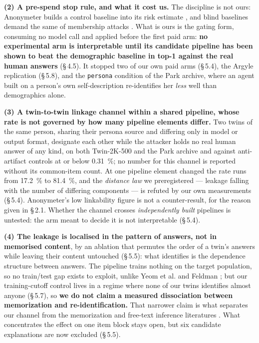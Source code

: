 \documentclass[sigconf,anonymous,review]{acmart}
\begin{document}
\textbf{(2) A pre-spend stop rule, and what it cost us.} The discipline is not ours: Anonymeter builds a control baseline into its risk estimate \cite{giomi2023unified}, and blind baselines demand the same of membership attacks \cite{das2024blind,zhang2024satml}. What is ours is the gating form, consuming no model call and applied before the first paid arm: \textbf{no experimental arm is interpretable until its candidate pipeline has been shown to beat the demographic baseline in top-1 against the real human answers} (\S\,4.5). It stopped two of our own paid arms (\S\,5.4), the Argyle replication (\S\,5.8), and the \texttt{persona} condition of the Park archive, where an agent built on a person's own self-description re-identifies her \textit{less} well than demographics alone.

\textbf{(3) A twin-to-twin linkage channel within a shared pipeline, whose rate is not governed by how many pipeline elements differ.} Two twins of the same person, sharing their persona source and differing only in model or output format, designate each other while the attacker holds no real human answer of any kind, on both Twin-2K-500 and the Park archive and against anti-artifact controls at or below 0.31~\%; no number for this channel is reported without its common-item count. At one pipeline element changed the rate runs from 17.2~\% to 81.4~\%, and the \textit{distance law} we preregistered --- leakage falling with the number of differing components --- is refuted by our own measurements (\S\,5.4). Anonymeter's low linkability figure is not a counter-result, for the reason given in \S\,2.1. Whether the channel crosses \textit{independently built} pipelines is untested: the arm meant to decide it is not interpretable (\S\,5.4).

\textbf{(4) The leakage is localised in the pattern of answers, not in memorised content}, by an ablation that permutes the order of a twin's answers while leaving their content untouched (\S\,5.5): what identifies is the dependence structure between answers. The pipeline trains nothing on the target population, so no train/test gap exists to exploit, unlike Yeom et al. \cite{yeom2018privacy} and Feldman \cite{feldman2020memorization}; but our training-cutoff control lives in a regime where none of our twins identifies almost anyone (\S\,5.7), so \textbf{we do not claim a measured dissociation between memorization and re-identification.} That narrower claim is what separates our channel from the memorization \cite{carlini2021extracting} and free-text inference literatures \cite{staab2024beyond,ko2026weakcues,lermen2026deanonymization}. What concentrates the effect on one item block stays open, but six candidate explanations are now excluded (\S\,5.5).
\end{document}

